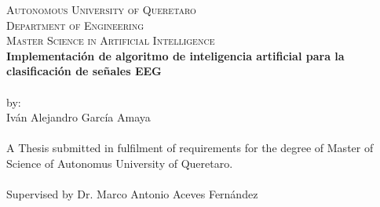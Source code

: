 \documentclass[letterpaper,12pt,openright,oneside]{article}
\begin{document}
\begin{titlepage}


\begin{center}


\textsc{\LARGE Autonomous University of Queretaro}\\[.5cm]
\textsc{\Large Department of Engineering \\ \large{Master Science in Artificial Intelligence}}\\[.5cm]

{  \bfseries Implementación de algoritmo de inteligencia artificial para la clasificación de señales EEG 
 \\[0.1cm] }
\emph{ } \\

by:\\
Iván Alejandro García Amaya\\ 
\emph{ } \\


A Thesis submitted in fulfilment of requirements for the degree of
Master of Science of Autonomus University of Queretaro.\\

\emph{ }\\


Supervised by Dr. Marco Antonio Aceves Fernández


\end{center}


\end{titlepage}
\end{document}
